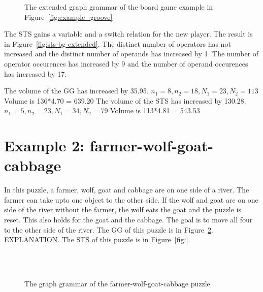 \begin{figure}[ht]
  \begin{center}
    \hspace{20px}
  \end{center}
  \caption{The extended graph grammar of the board game example in Figure~\ref{fig:example_groove}}
  \label{fig:gg-bg-extended}
\end{figure}

The STS gains a variable and a switch relation for the new player. The result is in Figure~\ref{fig:sts-bg-extended}. The distinct number of operators has not increased and the distinct number of operands has increased by 1. The number of operator occurences has increased by 9 and the number of operand occurences has increased by 17.

The volume of the GG has increased by 35.95. $n_1 = 8, n_2 = 18, N_1 = 23, N_2 = 113$ Volume is 136*4.70 = 639.20
The volume of the STS has increased by 130.28. $n_1 = 5, n_2 = 23, N_1 = 34, N_2 = 79$ Volume is 113*4.81 = 543.53


\section{Example 2: farmer-wolf-goat-cabbage}
In this puzzle, a farmer, wolf, goat and cabbage are on one side of a river. The farmer can take upto one object to the other side. If the wolf and goat are on one side of the river without the farmer, the wolf eats the goat and the puzzle is reset. This also holds for the goat and the cabbage. The goal is to move all four to the other side of the river. The GG of this puzzle is in Figure~\ref{fig:gg-fwgc}. EXPLANATION. The STS of this puzzle is in Figure~\ref{fig:}.

\begin{figure}[ht]
  \begin{center}
    \hspace{20px}
    \\
    \hspace{20px}
    \\
  \end{center}
  \caption{The graph grammar of the farmer-wolf-goat-cabbage puzzle}
  \label{fig:gg-fwgc}
\end{figure}

